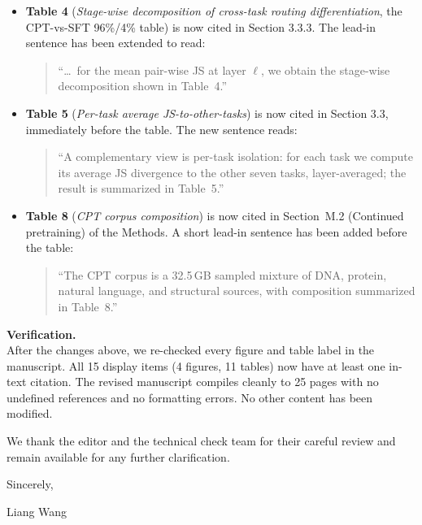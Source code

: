 \documentclass[11pt]{article}
\begin{document}
\begin{itemize}[leftmargin=2em,itemsep=0.4em,topsep=0.3em]
\item \textbf{Table 4} (\emph{Stage-wise decomposition of cross-task routing differentiation}, the CPT-vs-SFT 96\%/4\% table) is now cited in Section 3.3.3. The lead-in sentence has been extended to read:
\begin{quote}
\small
``\ldots\ for the mean pair-wise JS at layer $\ell$, we obtain the stage-wise decomposition shown in Table~4.''
\end{quote}

\item \textbf{Table 5} (\emph{Per-task average JS-to-other-tasks}) is now cited in Section 3.3, immediately before the table. The new sentence reads:
\begin{quote}
\small
``A complementary view is per-task isolation: for each task we compute its average JS divergence to the other seven tasks, layer-averaged; the result is summarized in Table~5.''
\end{quote}

\item \textbf{Table 8} (\emph{CPT corpus composition}) is now cited in Section~M.2 (Continued pretraining) of the Methods. A short lead-in sentence has been added before the table:
\begin{quote}
\small
``The CPT corpus is a 32.5\,GB sampled mixture of DNA, protein, natural language, and structural sources, with composition summarized in Table~8.''
\end{quote}
\end{itemize}

\vspace{1em}

\textbf{\color{editorblue}Verification.}\\
After the changes above, we re-checked every figure and table label in the manuscript. All 15 display items (4 figures, 11 tables) now have at least one in-text citation. The revised manuscript compiles cleanly to 25 pages with no undefined references and no formatting errors. No other content has been modified.

We thank the editor and the technical check team for their careful review and remain available for any further clarification.

\vspace{1.5em}

Sincerely,

\vspace{0.5em}

Liang Wang
\end{document}
